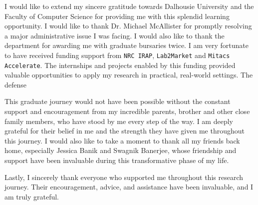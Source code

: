 I would like to extend my sincere gratitude towards Dalhousie University and the Faculty of Computer Science for providing me with this splendid learning opportunity. I would like to thank Dr. Michael McAllister for promptly resolving a major administrative issue I was facing. I would also like to thank the department for awarding me with graduate bursaries twice. I am very fortunate to have received funding support from \texttt{NRC IRAP}, \texttt{Lab2Market} and \texttt{Mitacs Accelerate}. The internships and projects enabled by this funding provided valuable opportunities to apply my research in practical, real-world settings. The defense

This graduate journey would not have been possible without the constant support and encouragement from my incredible parents, brother and other close family members, who have stood by me every step of the way. I am deeply grateful for their belief in me and the strength they have given me throughout this journey. I would also like to take a moment to thank all my friends back home, especially Jessica Banik and Swagnik Banerjee, whose friendship and support have been invaluable during this transformative phase of my life. 

Lastly, I sincerely thank everyone who supported me throughout this research journey. Their encouragement, advice, and assistance have been invaluable, and I am truly grateful.